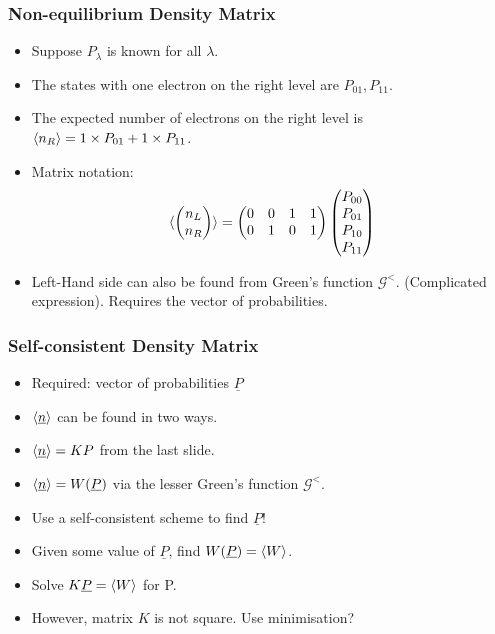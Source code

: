 \begin{frame}
    \frametitle{Non-equilibrium Density Matrix}
    \begin{itemize}
        \item Suppose $P_\lambda$ is known for all $\lambda$.
        \item The states with one electron on the right level are $P_{01}, P_{11}$.
        \item The expected number of electrons on the right level is $\braket{n_R} = 1 \times P_{01} + 1 \times P_{11}$.
        \item Matrix notation: \begin{align*}\braket{ \begin{pmatrix} n_L \\ n_R \end{pmatrix}} = \begin{pmatrix} 0 & 0 & 1 & 1 \\ 0 & 1 & 0 & 1\end{pmatrix}\begin{pmatrix} P_{00} \\ P_{01} \\ P_{10} \\ P_{11} \end{pmatrix}\end{align*}
        \item Left-Hand side can also be found from Green's function $\mathscr{G}^{<}$. (Complicated expression). Requires the vector of probabilities.
    \end{itemize} 
\end{frame}%
\begin{frame}
    \frametitle{Self-consistent Density Matrix}
    \begin{itemize} 
    \item Required: vector of probabilities $\underline{P}$
    \item $\braket{\underline{n}}$ can be found in two ways.
    \item $\braket{\underline{n}} = K P$ from the last slide.
    \item $\braket{\underline{n}} = W(\underline{P})$ via the lesser Green's function $\mathscr{G}^<$. 
    \item Use a self-consistent scheme to find $\underline{P}$!
    \item Given some value of $\underline{P}$, find $W(\underline{P}) = \braket{W}$.
    \item Solve $ K \underline{P} = \braket{W}$ for P.
    \item However, matrix $K$ is not square. Use minimisation?
    \end{itemize} 
\end{frame}%
